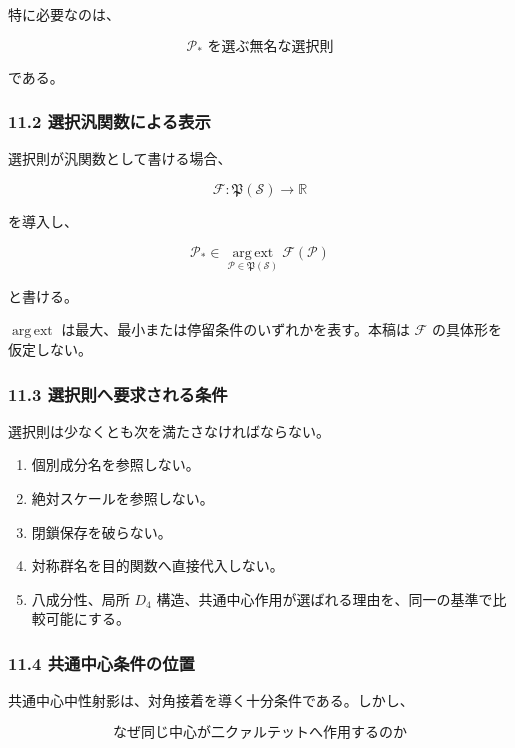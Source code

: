 \documentclass[
  a4paper,
  ja=minimal,
  xelatex,
  paragraph-mark={},
]{bxjsarticle}
\providecommand{\tightlist}{%
  \setlength{\itemsep}{0pt}\setlength{\parskip}{0pt}}
\begin{document}
特に必要なのは、

\[
\boxed{
\mathcal P_*
\text{ を選ぶ無名な選択則}
}
\]

である。

\subsubsection{11.2
選択汎関数による表示}\label{ux9078ux629eux6c4eux95a2ux6570ux306bux3088ux308bux8868ux793a}

選択則が汎関数として書ける場合、

\[
\mathcal F:
\mathfrak P(\mathscr S)
\longrightarrow
\mathbb R
\]

を導入し、

\[
\mathcal P_*
\in
\operatorname*{arg\,ext}_{\mathcal P\in\mathfrak P(\mathscr S)}
\mathcal F(\mathcal P)
\]

と書ける。

\(\operatorname*{arg\,ext}\)
は最大、最小または停留条件のいずれかを表す。本稿は \(\mathcal F\)
の具体形を仮定しない。

\subsubsection{11.3
選択則へ要求される条件}\label{ux9078ux629eux5247ux3078ux8981ux6c42ux3055ux308cux308bux6761ux4ef6}

選択則は少なくとも次を満たさなければならない。

\begin{enumerate}
\def\labelenumi{\arabic{enumi}.}
\tightlist
\item
  個別成分名を参照しない。
\item
  絶対スケールを参照しない。
\item
  閉鎖保存を破らない。
\item
  対称群名を目的関数へ直接代入しない。
\item
  八成分性、局所 \(D_4\)
  構造、共通中心作用が選ばれる理由を、同一の基準で比較可能にする。
\end{enumerate}

\subsubsection{11.4
共通中心条件の位置}\label{ux5171ux901aux4e2dux5fc3ux6761ux4ef6ux306eux4f4dux7f6e}

共通中心中性射影は、対角接着を導く十分条件である。しかし、

\[
\text{なぜ同じ中心が二クァルテットへ作用するのか}
\]
\end{document}
